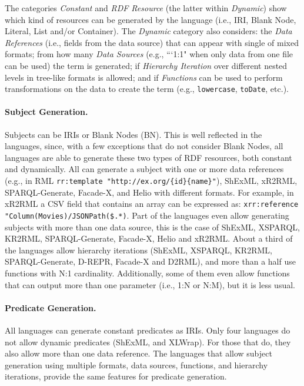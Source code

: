 The categories \textit{Constant} and \textit{RDF Resource} (the latter within \textit{Dynamic}) show which kind of resources can be generated by the language (i.e., IRI, Blank Node, Literal, List and/or Container). The \textit{Dynamic} category also considers: the \textit{Data References} (i.e., fields from the data source) that can appear with single of mixed formats; from how many \textit{Data Sources} (e.g., ```1:1" when only data from one file can be used) the term is generated; if \textit{Hierarchy Iteration} over different nested levels in tree-like formats is allowed; and if \textit{Functions} can be used to perform transformations on the data to create the term (e.g., \texttt{lowercase}, \texttt{toDate}, etc.).

\noindent\paragraph{\textbf{Subject Generation.}} Subjects can be IRIs or Blank Nodes (BN). This is well reflected in the languages, since, with a few exceptions that do not consider Blank Nodes, all languages are able to generate these two types of RDF resources, both constant and dynamically. All can generate a subject with one or more data references (e.g., in RML \texttt{rr:template "http://ex.org/\{id\}\-\{name\}"}), ShExML, xR2R\-ML, SPARQL-Generate, Facade-X, and Helio with different formats. For example, in xR2RML a CSV field that contains an array can be expressed as: \texttt{xrr:reference "Column(Mo\-vies)/JSONPath(\$.*)}. Part of the languages even allow generating subjects with more than one data source, this is the case of ShExML, XSPARQL, KR2RML, SPARQL-Generate, Facade-X, Helio and xR2RML. About a third of the languages allow hierarchy iterations (ShExML, XSPARQL, KR2RML, SPARQL-Generate, D-REPR, Facade-X and D2RML), and more than a half use functions with N:1 cardinality. Additionally, some of them even allow functions that can output more than one parameter (i.e., 1:N or N:M), but it is less usual.



\noindent\paragraph{\textbf{Predicate Generation.}} All languages can generate constant predicates as IRIs. Only four languages do not allow dynamic predicates (ShExML, and XLWrap). For those that do, they also allow more than one data reference. The languages that allow subject generation using multiple formats, data sources, functions, and hierarchy iterations, provide the same features for predicate generation.

